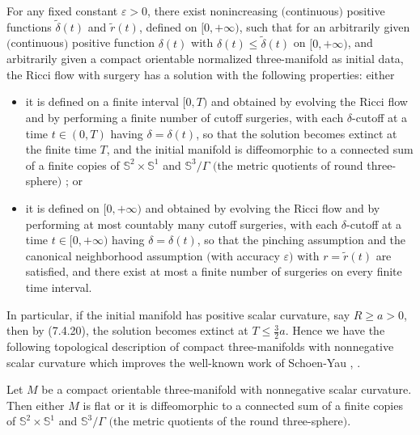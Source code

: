 \begin{theorem}
  \label{thm:cz-ricci-flow-surgery-long-time-existence}

For any fixed constant $\varepsilon >0$, there exist nonincreasing
$($continuous$)$ positive functions $\widetilde{\delta}(t)$ and
$\widetilde{r}(t)$, defined on $[0,+\infty)$, such that for an
arbitrarily given $($continuous$)$ positive function $\delta(t)$
with $\delta(t) \leq \widetilde{\delta}(t)$ on $[0,+\infty)$, and
arbitrarily given a compact orientable normalized three-manifold
as initial data, the Ricci flow with surgery has a solution with
the following properties: either
\begin{itemize}
\item[(i)] it is defined on a finite interval $[0,T)$ and obtained
by evolving the Ricci flow and by performing a finite number of
cutoff surgeries, with each $\delta$-cutoff at a time $t \in
(0,T)$ having ${\delta}= \delta(t)$, so that the solution becomes
extinct at the finite time $T$, and the initial manifold is
diffeomorphic to a connected sum of a finite copies of
$\mathbb{S}^2\times \mathbb{S}^1$ and $\mathbb{S}^3/\Gamma$ $($the
metric quotients of round three-sphere$)$ ; or \item[(ii)] it is
defined on $[0,+\infty)$ and obtained by evolving the Ricci flow
and by performing at most countably many cutoff surgeries, with
each $\delta$-cutoff at a time $t \in [0,+\infty)$ having
${\delta}=\delta(t)$, so that the pinching assumption and the
canonical neighborhood assumption $($with accuracy $\varepsilon)$
with $r=\widetilde{r}(t)$ are satisfied, and there exist at most a
finite number of surgeries on every finite time interval.
\end{itemize}
\end{theorem}

In particular, if the initial manifold has positive scalar
curvature, say $R\geq a>0$, then by (7.4.20), the solution becomes
extinct at $T\leq \frac{3}{2}a$. Hence we have the following
topological description of compact three-manifolds with
nonnegative scalar curvature which improves the well-known work of
Schoen-Yau \cite{ScY79m}, \cite{ScY79}.

\begin{corollary}
  \label{cor:cz-finite-extinction-topological-classification}

 Let $M$ be a compact orientable three-manifold with nonnegative
scalar curvature. Then either $M$ is flat or it is diffeomorphic
to a connected sum of a finite copies of $\mathbb{S}^2\times
\mathbb{S}^1$ and $\mathbb{S}^3/\Gamma$ $($the metric quotients of
the round three-sphere$).$
\end{corollary}

